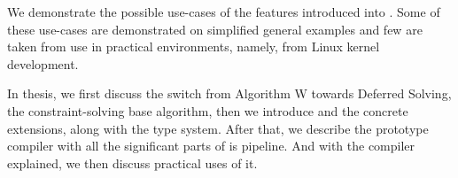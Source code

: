 We demonstrate the possible use-cases of the features introduced into \cmm{}. Some of these use-cases are demonstrated on simplified general examples and few are taken from use in practical environments, namely, from Linux kernel development.

In thesis, we first discuss the switch from Algorithm W towards Deferred Solving, the constraint-solving base algorithm, then we introduce \cmm{} and the concrete extensions, along with the type system. After that, we describe the prototype compiler with all the significant parts of is pipeline. And with the compiler explained, we then discuss practical uses of it.
